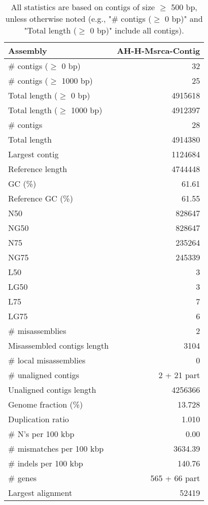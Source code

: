 \documentclass[12pt,a4paper]{article}
\begin{document}
\begin{table}[ht]
\begin{center}
\caption{All statistics are based on contigs of size $\geq$ 500 bp, unless otherwise noted (e.g., "\# contigs ($\geq$ 0 bp)" and "Total length ($\geq$ 0 bp)" include all contigs).}
\begin{tabular}{|l*{1}{|r}|}
\hline
Assembly & AH-H-Msrca-Contig \\ \hline
\# contigs ($\geq$ 0 bp) & 32 \\ \hline
\# contigs ($\geq$ 1000 bp) & 25 \\ \hline
Total length ($\geq$ 0 bp) & 4915618 \\ \hline
Total length ($\geq$ 1000 bp) & 4912397 \\ \hline
\# contigs & 28 \\ \hline
Total length & 4914380 \\ \hline
Largest contig & 1124684 \\ \hline
Reference length & 4744448 \\ \hline
GC (\%) & 61.61 \\ \hline
Reference GC (\%) & 61.55 \\ \hline
N50 & 828647 \\ \hline
NG50 & 828647 \\ \hline
N75 & 235264 \\ \hline
NG75 & 245339 \\ \hline
L50 & 3 \\ \hline
LG50 & 3 \\ \hline
L75 & 7 \\ \hline
LG75 & 6 \\ \hline
\# misassemblies & 2 \\ \hline
Misassembled contigs length & 3104 \\ \hline
\# local misassemblies & 0 \\ \hline
\# unaligned contigs & 2 + 21 part \\ \hline
Unaligned contigs length & 4256366 \\ \hline
Genome fraction (\%) & 13.728 \\ \hline
Duplication ratio & 1.010 \\ \hline
\# N's per 100 kbp & 0.00 \\ \hline
\# mismatches per 100 kbp & 3634.39 \\ \hline
\# indels per 100 kbp & 140.76 \\ \hline
\# genes & 565 + 66 part \\ \hline
Largest alignment & 52419 \\ \hline
\end{tabular}
\end{center}
\end{table}
\end{document}
